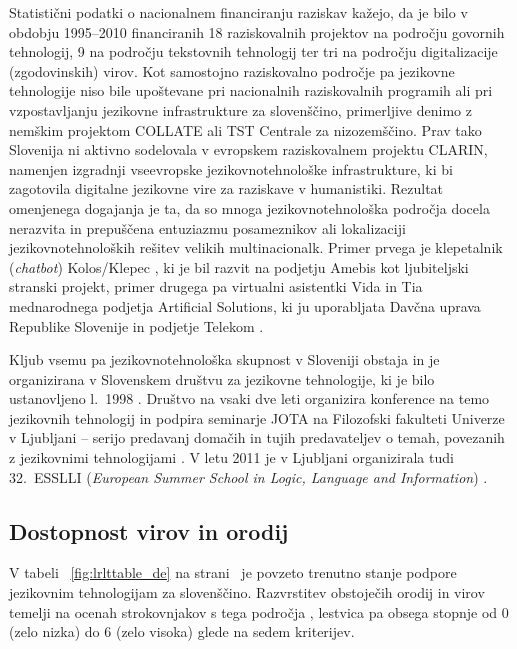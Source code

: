 \begin{multicols}{2}
Statistični podatki o nacionalnem financiranju raziskav kažejo, da je bilo v obdobju 1995--2010 financiranih 18 raziskovalnih projektov na področju go\-vornih tehnologij, 9 na področju teks\-tovnih tehnologij ter tri na področju digitalizacije (zgodovinskih) virov. Kot samostojno raziskovalno področje pa jezikovne tehnologije niso bile upoštevane pri nacionalnih raziskovalnih programih ali pri vzpostav\-ljanju jezikovne infrastrukture za slovenščino, primerljive denimo z nemškim projektom COLLATE ali TST Centrale za nizozemščino. Prav tako Slovenija ni aktivno sodelovala v evropskem raziskovalnem projektu CLARIN, namenjen izgradnji vseevropske jezikovnotehnološke infrastrukture, ki bi zagotovila digitalne jezikovne vire za raziskave v humanistiki. Rezultat omenjenega dogajanja je ta, da so mnoga jezikovnotehnološka področja docela ne\-razvita in prepuščena entuziazmu posameznikov ali lokalizaciji jezikovnotehnoloških rešitev velikih multinacionalk. Primer prvega je klepetalnik (\textit{chatbot}) Kolos/Klepec \cite{Amb7}, ki je bil razvit na podjetju Amebis kot ljubiteljski stranski projekt,  primer drugega pa virtualni asistentki Vida in Tia mednaro\-dnega podjetja Artificial Solutions, ki ju uporab\-ljata Davčna uprava Republike Slovenije in podjetje Telekom \cite{Chat1}. 

Kljub vsemu pa jezikovnotehnološka skupnost v Sloveniji obstaja in je organizirana v Slovenskem društvu za jezikovne tehnologije, ki je bilo ustanov\-ljeno l.~1998 \cite{SDJT1}.  Društvo na vsaki dve leti organizira konference na temo jezikovnih tehnologij in podpira seminarje JOTA na Filozofski fakulteti Univerze v Ljub\-ljani – serijo predavanj domačih in tujih predavateljev o temah, povezanih z jezikov\-nimi tehnologijami \cite{Jota1}. V letu 2011 je v Ljub\-ljani organizirala tudi 32.~ESSLLI (\textit{European Summer School in Logic, Language and Information}) \cite{ESSLLI1}. 

\subsection{Dostopnost virov in orodij}

V tabeli ~\ref{fig:lrlttable_de} na strani~\pageref{fig:lrlttable_de} je povzeto trenutno stanje podpore jezikovnim tehnologijam za slovenščino. Razvrstitev obstoječih orodij in virov temelji na ocenah strokovnjakov s tega področja \cite{expert1}, lestvica pa obsega stopnje od 0 (zelo nizka) do 6 (zelo visoka) glede na sedem kriterijev. 


\end{multicols}
